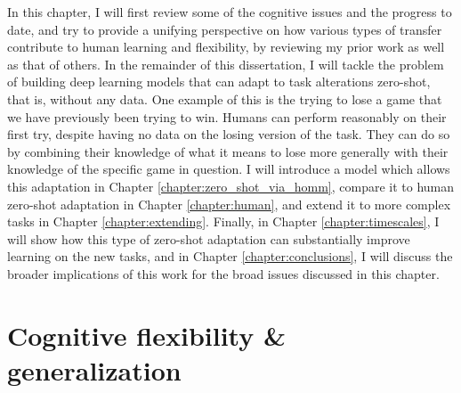 In this chapter, I will first review some of the cognitive issues and the progress to date, and try to provide a unifying perspective on how various types of transfer contribute to human learning and flexibility, by reviewing my prior work as well as that of others. In the remainder of this dissertation, I will tackle the problem of building deep learning models that can adapt to task alterations zero-shot, that is, without any data. One example of this is the trying to lose a game that we have previously been trying to win. Humans can perform reasonably on their first try, despite having no data on the losing version of the task. They can do so by combining their knowledge of what it means to lose more generally with their knowledge of the specific game in question. I will introduce a model which allows this adaptation in Chapter \ref{chapter:zero_shot_via_homm}, compare it to human zero-shot adaptation in Chapter \ref{chapter:human}, and extend it to more complex tasks in Chapter \ref{chapter:extending}. Finally, in Chapter \ref{chapter:timescales}, I will show how this type of zero-shot adaptation can substantially improve learning on the new tasks, and in Chapter \ref{chapter:conclusions}, I will discuss the broader implications of this work for the broad issues discussed in this chapter.\par 

\section{Cognitive flexibility \& generalization}

